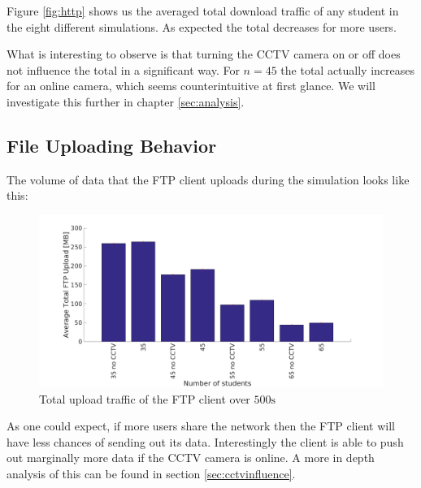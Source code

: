 \documentclass[a4paper]{scrreprt}
\begin{document}
			Figure \ref{fig:http} shows us the averaged total download traffic of any student in the eight different simulations. As expected the total decreases for more users.
			
			What is interesting to observe is that turning the CCTV camera on or off does not influence the total in a significant way. For $n=45$ the total actually increases for an online camera, which seems counterintuitive at first glance. We will investigate this further in chapter \ref{sec:analysis}.		
			
		\subsection{File Uploading Behavior}\label{sec:ftp}		
			The volume of data that the FTP client uploads during the simulation looks like this:
			\begin{figure}[H]
				\center\includegraphics[width=\textwidth]{../Results_Analysis/FTP/ftp.png}
				\caption{Total upload traffic of the FTP client over $500\text{s}$}
				\label{fig:ftp}
			\end{figure}		
			
			As one could expect, if more users share the network then the FTP client will have less chances of sending out its data. Interestingly the client is able to push out marginally more data if the CCTV camera is online. A more in depth analysis of this can be found in section \ref{sec:cctvinfluence}.
			
\end{document}
